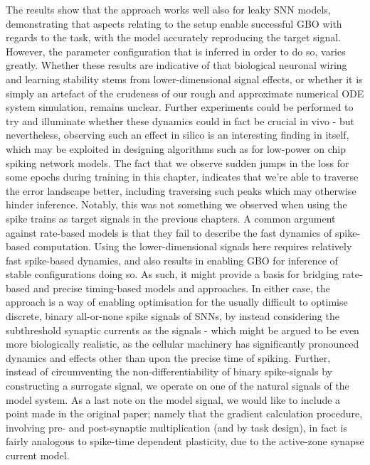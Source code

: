\documentclass[mphil,deptreport,ianc]{infthesis} %
\begin{document}
The results show that the approach works well also for leaky SNN models, demonstrating that aspects relating to the setup enable successful GBO with regards to the task, with the model accurately reproducing the target signal.
However, the parameter configuration that is inferred in order to do so, varies greatly.
Whether these results are indicative of that biological neuronal wiring and learning stability stems from lower-dimensional signal effects, or whether it is simply an artefact of the crudeness of our rough and approximate numerical ODE system simulation, remains unclear.
Further experiments could be performed to try and illuminate whether these dynamics could in fact be crucial in vivo - but nevertheless, observing such an effect in silico is an interesting finding in itself, which may be exploited in designing algorithms such as for low-power on chip spiking network models.
The fact that we observe sudden jumps in the loss for some epochs during training in this chapter, indicates that we're able to traverse the error landscape better, including traversing such peaks which may otherwise hinder inference.
Notably, this was not something we observed when using the spike trains as target signals in the previous chapters.
A common argument against rate-based models is that they fail to describe the fast dynamics of spike-based computation.
Using the lower-dimensional signals here requires relatively fast spike-based dynamics, and also results in enabling GBO for inference of stable configurations doing so.
As such, it might provide a basis for bridging rate-based and precise timing-based models and approaches.
In either case, the approach is a way of enabling optimisation for the usually difficult to optimise discrete, binary all-or-none spike signals of SNNs, by instead considering the subthreshold synaptic currents as the signals - which might be argued to be even more biologically realistic, as the cellular machinery has significantly pronounced dynamics and effects other than upon the precise time of spiking.
Further, instead of circumventing the non-differentiability of binary spike-signals by constructing a surrogate signal, we operate on one of the natural signals of the model system.
As a last note on the model signal, we would like to include a point made in the original paper; namely that the gradient calculation procedure, involving pre- and post-synaptic multiplication (and by task design), in fact is fairly analogous to spike-time dependent plasticity, due to the active-zone synapse current model.
\end{document}

